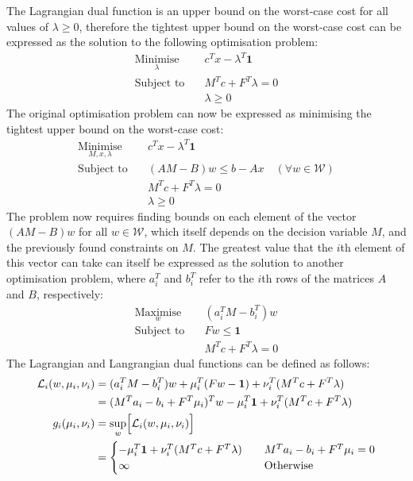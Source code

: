 The Lagrangian dual function is an upper bound on the worst-case cost for all values of $\lambda \ge 0$, therefore the tightest upper bound on the worst-case cost can be expressed as the solution to the following optimisation problem:
\begin{align*}
    \underset{\lambda}{\text{Minimise}} \quad & c^Tx - \lambda^T\mathbf{1} \\
    \text{Subject to} \quad & M^Tc + F^T\lambda = 0 \\
    & \lambda \ge 0
\end{align*}
The original optimisation problem can now be expressed as minimising the tightest upper bound on the worst-case cost:
\begin{align*}
    \underset{M, x, \lambda}{\text{Minimise}} \quad & c^Tx - \lambda^T\mathbf{1} \\
    \text{Subject to} \quad & (AM - B)w \le b - Ax \quad (\forall w\in\mathcal{W}) \\
    & M^Tc + F^T\lambda = 0 \\
    & \lambda \ge 0
\end{align*}
The problem now requires finding bounds on each element of the vector $(AM - B)w$ for all $w\in\mathcal{W}$, which itself depends on the decision variable $M$, and the previously found constraints on $M$. The greatest value that the $i$th element of this vector can take can itself be expressed as the solution to another optimisation problem, where $a_i^T$ and $b_i^T$ refer to the $i$th rows of the matrices $A$ and $B$, respectively:
\begin{align*}
    \underset{w}{\text{Maximise}} \quad & (a_i^TM - b_i^T)w \\
    \text{Subject to} \quad & Fw \le \mathbf{1} \\
    & M^Tc + F^T\lambda = 0
\end{align*}
The Lagrangian and Langrangian dual functions can be defined as follows:
\begin{align*}
    \mathcal{L}_i(w, \mu_i, \nu_i) &= (a_i^TM - b_i^T)w + \mu_i^T(Fw - \mathbf{1}) + \nu_i^T(M^Tc + F^T\lambda) \\
    &= (M^Ta_i - b_i + F^T\mu_i)^Tw - \mu_i^T \mathbf{1} + \nu_i^T(M^Tc + F^T\lambda) \\
    g_i(\mu_i, \nu_i) &= \underset{w}{\sup}\Bigl[ \mathcal{L}_i(w, \mu_i, \nu_i) \Bigr] \\
    &= \begin{cases}
        -\mu_i^T \mathbf{1} + \nu_i^T(M^Tc + F^T\lambda) \quad & M^Ta_i - b_i + F^T\mu_i = 0 \\
        \infty & \text{Otherwise}
    \end{cases}
\end{align*}
